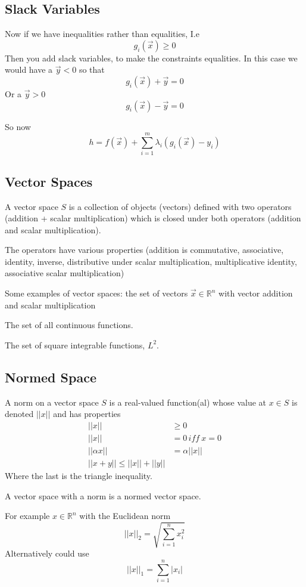 \documentclass{E:/Documents/Latex/myassignment}
\begin{document}
\subsection{Slack Variables}
Now if we have inequalities rather than equalities, I.e
\[g_i(\vec x) \geq 0\]
Then you add slack variables, to make the constraints equalities. 
In this case we would have a $\vec y < 0$ so that
\[g_i(\vec x) + \vec y = 0\]
Or a $\vec y > 0$
\[g_i(\vec x) - \vec y = 0\]

So now
\[h = f(\vec x) + \sum_{i=1}^m \lambda_i (g_i (\vec x) - y_i)\]


\subsection{Vector Spaces}
A vector space $S$ is a collection of objects (vectors) defined with two operators (addition + scalar multiplication) which is closed under both operators (addition and scalar multiplication).

The operators have various properties (addition is commutative, associative, identity, inverse, distributive under scalar multiplication, multiplicative identity, associative scalar multiplication) 

Some examples of vector spaces: 
the set of vectors $\vec x \in \mathbb{R}^{n}$ with vector addition and scalar multiplication

The set of all continuous functions.

The set of square integrable functions, $L^2$.


\subsection{Normed Space}
A norm on a vector space $S$ is a real-valued function(al) whose value at $x \in S$ is denoted $||x||$ and has properties
\begin{align*}
	||x||& \geq 0\\
	||x||& = 0\, iff \ x=0\\
	||\alpha x|| &= \alpha ||x||\\
	||x + y|| \leq ||x|| + ||y||
\end{align*}
Where the last is the triangle inequality.

A vector space with a norm is a normed vector space.

For example $x \in \mathbb{R}^n$ with the Euclidean norm
\[||x||_2 = \sqrt{\sum_{i=1}^n x_i^2}\]
Alternatively could use
\[||x||_1 = \sum_{i=1}^n |x_i|\]
\end{document}
